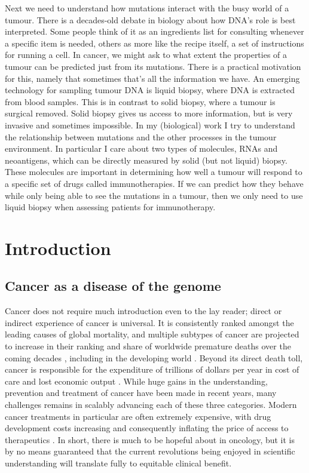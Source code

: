 \documentclass[10pt,twoside,openright]{report}
\begin{document}
Next we need to understand how mutations interact with the busy world of a tumour. There is a decades-old debate in biology about how DNA’s role is best interpreted. Some people think of it as an ingredients list for consulting whenever a specific item is needed, others as more like the recipe itself, a set of instructions for running a cell. In cancer, we might ask to what extent the properties of a tumour can be predicted just from its mutations. There is a practical motivation for this, namely that sometimes that’s all the information we have. An emerging technology for sampling tumour DNA is liquid biopsy, where DNA is extracted from blood samples. This is in contrast to solid biopsy, where a tumour is surgical removed. Solid biopsy gives us access to more information, but is very invasive and sometimes impossible. In my (biological) work I try to understand the relationship between mutations and the other processes in the tumour environment. In particular I care about two types of molecules, RNAs and neoantigens, which can be directly measured by solid (but not liquid) biopsy. These molecules are important in determining how well a tumour will respond to a specific set of drugs called immunotherapies. If we can predict how they behave while only being able to see the mutations in a tumour, then we only need to use liquid biopsy when assessing patients for immunotherapy. 

\printglossary[type=\acronymtype]

\tableofcontents

\chapter{Introduction}

\section{Cancer as a disease of the genome}
Cancer does not require much introduction even to the lay reader; direct or indirect experience of cancer is universal. It is consistently ranked amongst the leading causes of global mortality, and multiple subtypes of cancer are projected to increase in their ranking and share of worldwide premature deaths over the coming decades \citep{mathers_projections_2006}, including in the developing world \citep{kanavos_rising_2006}. Beyond its direct death toll, cancer is responsible for the expenditure of trillions of dollars per year in cost of care and lost economic output \citep{wild_world_2020}. While huge gains in the understanding, prevention and treatment of cancer have been made in recent years, many challenges remains in scalably advancing each of these three categories. Modern cancer treatments in particular are often extremely expensive, with drug development costs increasing and consequently inflating the price of access to therapeutics \citep{howard_pricing_2015}. In short, there is much to be hopeful about in oncology, but it is by no means guaranteed that the current revolutions being enjoyed in scientific understanding will translate fully to equitable clinical benefit.
\end{document}
